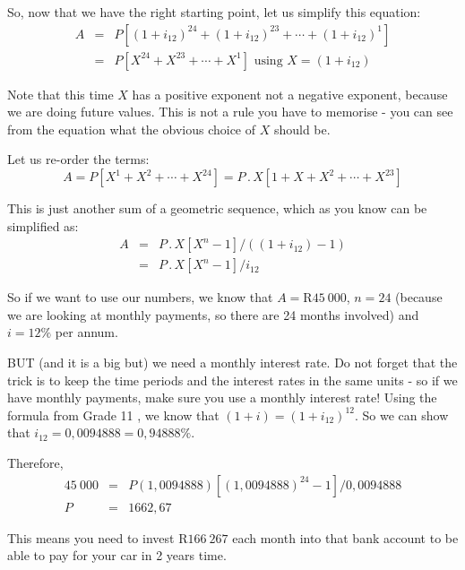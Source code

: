 So, now that we have the right starting point, let us simplify this equation:
\begin{eqnarray*}
A &=& P[(1+i_{12})^{24} + (1+i_{12})^{23} + \cdots + (1+i_{12})^{1}]\\
&=& P [ X^{24} + X^{23} + \cdots + X^1] \mbox{ using $X=(1+i_{12})$}
\end{eqnarray*}

Note that this time $X$ has a positive exponent not a negative exponent, because we are doing future values. This is not a rule you have to memorise - you can see from the equation what the obvious choice of $X$ should be.

Let us re-order the terms:
\begin{equation*}
A = P [ X^1 + X^2 + \cdots + X^{24}] = P \,.\, X [1 + X + X^2 + \cdots + X^{23}]
\end{equation*}

This is just another sum of a geometric sequence, which as you know can be simplified as:
\begin{eqnarray*}
A &=& P \,.\, X [X^n - 1] / ((1+i_{12})-1)\\
&=& P \,.\, X [X^n - 1] / i_{12}
\end{eqnarray*}

So if we want to use our numbers, we know that $A = $R$45~000$, $n=24$ (because we are looking at monthly payments, so there are 24 months involved) and $i = 12\%$ per annum.

BUT (and it is a big but) we need a monthly interest rate. Do not forget that the trick is to keep the time periods and the interest rates in the same units - so if we have monthly payments, make sure you use a monthly interest rate! Using the formula from Grade 11%
, we know that $(1+i) = (1+i_{12})^{12}$. So we can show that $i_{12} = 0,0094888 = 0,94888 \%$. 

Therefore,
\begin{eqnarray*}
45~000 &=& P (1,0094888) [(1,0094888)^{24} - 1] / 0,0094888\\
P&=&1 662,67
\end{eqnarray*}

This means you need to invest R$166~267$ each month into that bank account to be able to pay for your car in 2 years time.


